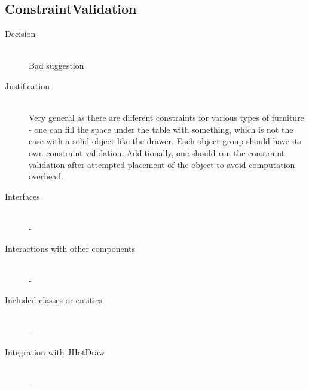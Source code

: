 \subsection{ConstraintValidation}
	\begin{description}
		\item[Decision] \hfill \\ Bad suggestion
		\item[Justification] \hfill \\ Very general as there are different constraints for various types of furniture - one can fill the space under the table with something, which is not the case with a solid object like the drawer. Each object group should have its own constraint validation. Additionally, one should run the constraint validation after attempted placement of the object to avoid computation overhead.
		\item[Interfaces] \hfill \\ -
		\item[Interactions with other components] \hfill \\ -
		\item[Included classes or entities] \hfill \\ -
		\item[Integration with JHotDraw] \hfill \\ -
	\end{description}